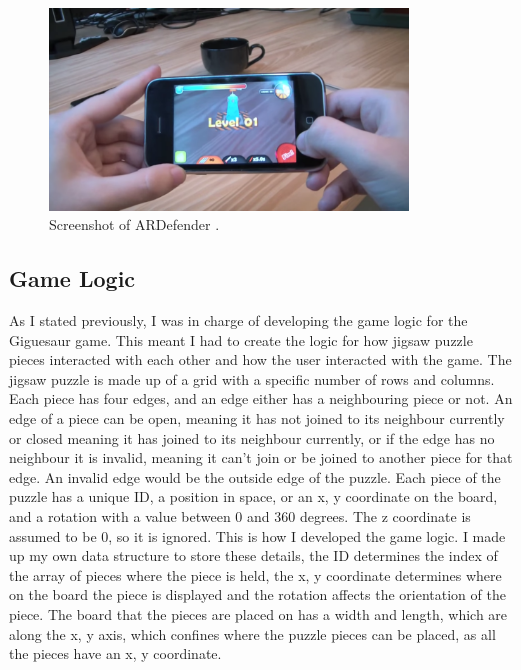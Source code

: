 \documentclass{article}
\begin{document}
\begin{figure}[ht]
\begin{center}
\includegraphics[width=0.85\textwidth]{images/ARDefenderImage}
\caption{Screenshot of ARDefender \cite{img:ARDefender}.}
\label{fig:ARDefender}
\end{center}
\end{figure}

\subsection{Game Logic}
As I stated previously, I was in charge of developing the game logic for the Giguesaur game. This meant I had to create the logic for how jigsaw puzzle pieces interacted with each other and how the user interacted with the game. The jigsaw puzzle is made up of a grid with a specific number of rows and columns. Each piece has four edges, and an edge either has a neighbouring piece or not. An edge of a piece can be open, meaning it has not joined to its neighbour currently or closed meaning it has joined to its neighbour currently, or if the edge has no neighbour it is invalid, meaning it can't join or be joined to another piece for that edge. An invalid edge would be the outside edge of the puzzle. Each piece of the puzzle has a unique ID, a position in space, or an x, y coordinate on the board, and a rotation with a value between 0 and 360 degrees. The z coordinate is assumed to be 0, so it is ignored. This is how I developed the game logic. I made up my own data structure to store these details, the ID determines the index of the array of pieces where the piece is held, the x, y coordinate determines where on the board the piece is displayed and the rotation affects the orientation of the piece. The board that the pieces are placed on has a width and length, which are along the x, y axis, which confines where the puzzle pieces can be placed, as all the pieces have an x, y coordinate. 
\end{document}
